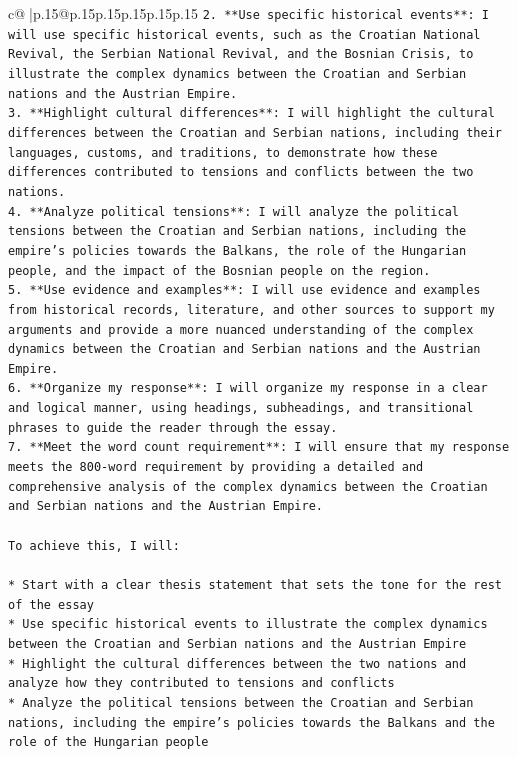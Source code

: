 \documentclass{article}
\begin{document}
{\begin{supertabular}{c@{$\;$}|p{.15\linewidth}@{}p{.15\linewidth}p{.15\linewidth}p{.15\linewidth}p{.15\linewidth}p{.15\linewidth}}
{{{\texttt{2. **Use specific historical events**: I will use specific historical events, such as the Croatian National Revival, the Serbian National Revival, and the Bosnian Crisis, to illustrate the complex dynamics between the Croatian and Serbian nations and the Austrian Empire.} \\
\texttt{3. **Highlight cultural differences**: I will highlight the cultural differences between the Croatian and Serbian nations, including their languages, customs, and traditions, to demonstrate how these differences contributed to tensions and conflicts between the two nations.} \\
\texttt{4. **Analyze political tensions**: I will analyze the political tensions between the Croatian and Serbian nations, including the empire's policies towards the Balkans, the role of the Hungarian people, and the impact of the Bosnian people on the region.} \\
\texttt{5. **Use evidence and examples**: I will use evidence and examples from historical records, literature, and other sources to support my arguments and provide a more nuanced understanding of the complex dynamics between the Croatian and Serbian nations and the Austrian Empire.} \\
\texttt{6. **Organize my response**: I will organize my response in a clear and logical manner, using headings, subheadings, and transitional phrases to guide the reader through the essay.} \\
\texttt{7. **Meet the word count requirement**: I will ensure that my response meets the 800{-}word requirement by providing a detailed and comprehensive analysis of the complex dynamics between the Croatian and Serbian nations and the Austrian Empire.} \\
\\ 
\texttt{To achieve this, I will:} \\
\\ 
\texttt{* Start with a clear thesis statement that sets the tone for the rest of the essay} \\
\texttt{* Use specific historical events to illustrate the complex dynamics between the Croatian and Serbian nations and the Austrian Empire} \\
\texttt{* Highlight the cultural differences between the two nations and analyze how they contributed to tensions and conflicts} \\
\texttt{* Analyze the political tensions between the Croatian and Serbian nations, including the empire's policies towards the Balkans and the role of the Hungarian people} \\
}}}
\end{supertabular}}
\end{document}
